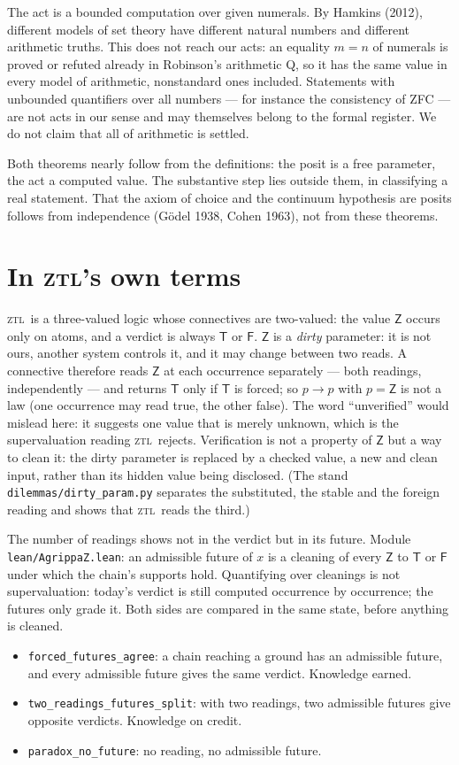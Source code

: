 \documentclass[11pt,a4paper]{article}
\newcommand{\T}{\mathsf{T}}
\newcommand{\F}{\mathsf{F}}
\newcommand{\Z}{\mathsf{Z}}
\newcommand{\ZTL}{\textsc{ztl}}
\newcommand{\code}[1]{\texttt{#1}}
\begin{document}
The act is a bounded computation over given numerals. By Hamkins (2012), different models of set theory have
different natural numbers and different arithmetic truths. This does not reach our acts: an equality $m = n$ of
numerals is proved or refuted already in Robinson's arithmetic Q, so it has the same value in every model of
arithmetic, nonstandard ones included. Statements with unbounded quantifiers over all numbers --- for instance the
consistency of ZFC --- are not acts in our sense and may themselves belong to the formal register. We do not claim
that all of arithmetic is settled.

Both theorems nearly follow from the definitions: the posit is a free parameter, the act a computed value. The
substantive step lies outside them, in classifying a real statement. That the axiom of choice and the continuum
hypothesis are posits follows from independence (Gödel 1938, Cohen 1963), not from these theorems.

\section{In \ZTL's own terms}

\ZTL\ is a three-valued logic whose connectives are two-valued: the value $\Z$ occurs only on atoms, and a verdict is
always $\T$ or $\F$. $\Z$ is a \emph{dirty} parameter: it is not ours, another system controls it, and it may change
between two reads. A connective therefore reads $\Z$ at each occurrence separately --- both readings, independently ---
and returns $\T$ only if $\T$ is forced; so $p \to p$ with $p = \Z$ is not a law (one occurrence may read true, the
other false). The word ``unverified'' would mislead here: it suggests one value that is merely unknown, which is the
supervaluation reading \ZTL\ rejects. Verification is not a property of $\Z$ but a way to clean it: the dirty
parameter is replaced by a checked value, a new and clean input, rather than its hidden value being disclosed. (The stand \code{dilemmas/dirty\_param.py} separates the substituted, the
stable and the foreign reading and shows that \ZTL\ reads the third.)

The number of readings shows not in the verdict but in its future. Module \code{lean/AgrippaZ.lean}: an admissible
future of $x$ is a cleaning of every $\Z$ to $\T$ or $\F$ under which the chain's supports hold. Quantifying over
cleanings is not supervaluation: today's verdict is still computed occurrence by occurrence; the futures only grade
it. Both sides are compared in the same state, before anything is cleaned.
\begin{itemize}
\item \code{forced\_futures\_agree}: a chain reaching a ground has an admissible future, and every admissible future
  gives the same verdict. Knowledge earned.
\item \code{two\_readings\_futures\_split}: with two readings, two admissible futures give opposite verdicts.
  Knowledge on credit.
\item \code{paradox\_no\_future}: no reading, no admissible future.
\end{itemize}
\end{document}
